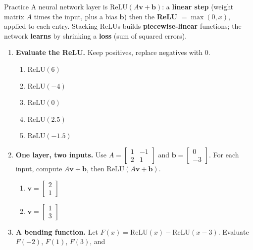 \documentclass[10pt]{article}
\newcommand{\vv}{\mathbf{v}}
\newcommand{\bb}{\mathbf{b}}
\newcommand{\relu}{\mathrm{ReLU}}
\begin{document}
\namedateperiod

\vspace{0.12in}

\begin{notesbox}{Practice}
A neural network layer is $\relu(A\vv+\bb)$: a \textbf{linear step} (weight matrix $A$ times the input,
plus a bias $\bb$) then the \textbf{ReLU} $=\max(0,x)$, applied to each entry. Stacking ReLUs builds
\textbf{piecewise-linear} functions; the network \textbf{learns} by shrinking a \textbf{loss} (sum of
squared errors).

\begin{enumerate}[leftmargin=1.9em, itemsep=12pt]
  \item \textbf{Evaluate the ReLU.} Keep positives, replace negatives with $0$.
    \begin{enumerate}[label=(\alph*), leftmargin=1.8em, itemsep=4pt]
      \item $\relu(6)$ \hfill
      \item $\relu(-4)$ \hfill
      \item $\relu(0)$ \hfill
      \item $\relu(2.5)$ \hfill
      \item $\relu(-1.5)$
    \end{enumerate}
    \vspace{0.8cm}
  \item \textbf{One layer, two inputs.} Use $A=\begin{bmatrix} 1 & -1 \\ 2 & 1 \end{bmatrix}$ and
        $\bb=\begin{bmatrix} 0 \\ -3 \end{bmatrix}$. For each input, compute $A\vv+\bb$, then
        $\relu(A\vv+\bb)$.
    \begin{enumerate}[label=(\alph*), leftmargin=1.8em, itemsep=4pt]
      \item $\vv=\begin{bmatrix} 2 \\ 1 \end{bmatrix}$ \hfill
      \item $\vv=\begin{bmatrix} 1 \\ 3 \end{bmatrix}$
    \end{enumerate}
    \vspace{1.1cm}
  \item \textbf{A bending function.} Let $F(x)=\relu(x)-\relu(x-3)$. Evaluate $F(-2)$, $F(1)$, $F(3)$, and

\end{enumerate}
\end{notesbox}
\end{document}

